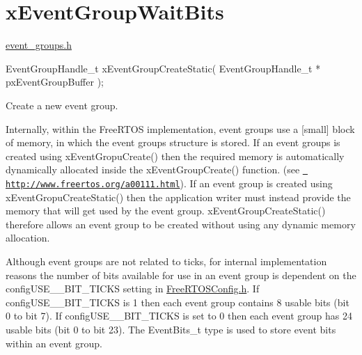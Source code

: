 \hypertarget{group__x_event_group_wait_bits}{}\section{x\+Event\+Group\+Wait\+Bits}
\label{group__x_event_group_wait_bits}
\mbox{\hyperlink{event__groups_8h}{event\+\_\+groups.\+h}} 
\begin{DoxyPre}
EventGroupHandle\_t xEventGroupCreateStatic( EventGroupHandle\_t * pxEventGroupBuffer );
\end{DoxyPre}


Create a new event group.

Internally, within the Free\+R\+T\+OS implementation, event groups use a \mbox{[}small\mbox{]} block of memory, in which the event group\textquotesingle{}s structure is stored. If an event groups is created using x\+Event\+Gropu\+Create() then the required memory is automatically dynamically allocated inside the x\+Event\+Group\+Create() function. (see \href{http://www.freertos.org/a00111.html}{\texttt{ http\+://www.\+freertos.\+org/a00111.\+html}}). If an event group is created using x\+Event\+Gropu\+Create\+Static() then the application writer must instead provide the memory that will get used by the event group. x\+Event\+Group\+Create\+Static() therefore allows an event group to be created without using any dynamic memory allocation.

Although event groups are not related to ticks, for internal implementation reasons the number of bits available for use in an event group is dependent on the config\+U\+S\+E\+\_\+\_\+\+B\+I\+T\+\_\+\+T\+I\+C\+KS setting in \mbox{\hyperlink{_free_r_t_o_s_config_8h}{Free\+R\+T\+O\+S\+Config.\+h}}. If config\+U\+S\+E\+\_\+\_\+\+B\+I\+T\+\_\+\+T\+I\+C\+KS is 1 then each event group contains 8 usable bits (bit 0 to bit 7). If config\+U\+S\+E\+\_\+\_\+\+B\+I\+T\+\_\+\+T\+I\+C\+KS is set to 0 then each event group has 24 usable bits (bit 0 to bit 23). The Event\+Bits\+\_\+t type is used to store event bits within an event group.


